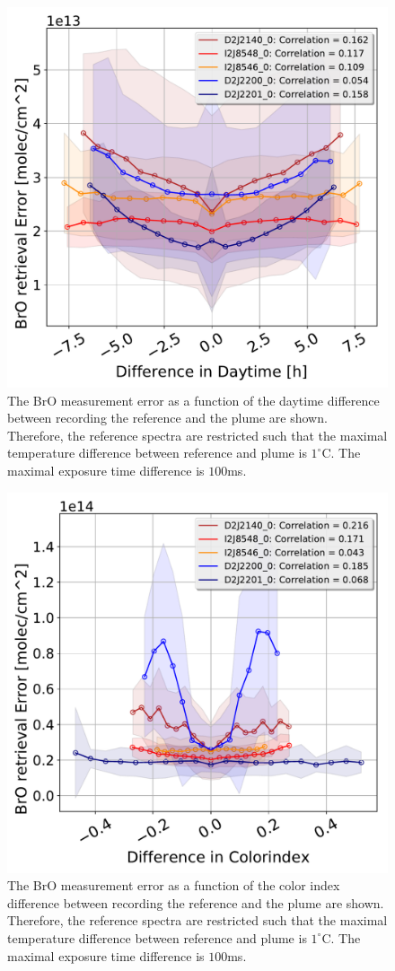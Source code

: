 \documentclass  [
  paper    = a4,
  BCOR     = 10mm,
  twoside,
  fontsize = 12pt,
  fleqn,
  toc      = bibnumbered,
  toc      = listofnumbered,
  numbers  = noendperiod,
  headings = normal,
  listof   = leveldown,
  version  = 3.03
]                                       {scrreprt}
\begin{document}
\begin{figure}[h]
	\centering
	\includegraphics[width=0.5\linewidth]{Bilder/BrOErr_OhnEVar/DiffDaytimewithoutOtherparamallInstruments}
	\caption{The BrO measurement error as a function of the daytime difference between recording the reference and the plume are shown. Therefore, the reference spectra are restricted such that the maximal temperature difference between reference and plume is $1^\circ $C. The maximal exposure time difference is $100 $ms.
	}
	\label{fig:diffdaytimewithoutotherparamallinstruments}
\end{figure}
\begin{figure}[h]
	\centering
	\includegraphics[width=0.5\linewidth]{Bilder/BrOErr_OhnEVar/DiffColidxwithoutOtherparamallInstruments}
	\caption{The BrO measurement error as a function of the color index difference between recording the reference and the plume are shown. Therefore, the reference spectra are restricted such that the maximal temperature difference between reference and plume is $1^\circ $C. The maximal exposure time difference is $100 $ms.}
	\label{fig:diffcolidxwithoutotherparamallinstruments}
\end{figure}
\end{document}
